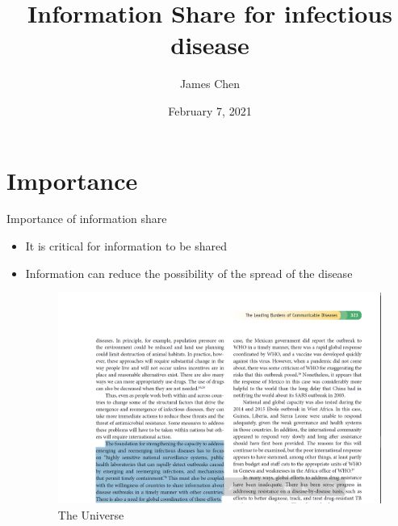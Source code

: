 \documentclass{beamer}
\title[Information Sharing for infectious disease]{Information Share for infectious disease}
\author{James Chen}
\institute{NYU Shanghai}
\date{February 7, 2021}
\begin{document}
\begin{frame}
  \titlepage
\end{frame}


\section{Importance}
\begin{frame}{Importance of information share}
\begin{itemize}

  \item It is critical for information to be shared 
  \item Information can reduce the possibility of the spread of the disease 
  
\begin{figure}[H]
\centering
\includegraphics[scale=0.375]{textbook.png}
\caption{The Universe}
\end{figure}
\citep{skolnik_2015}
\end{itemize}

\end{frame}
\end{document}
